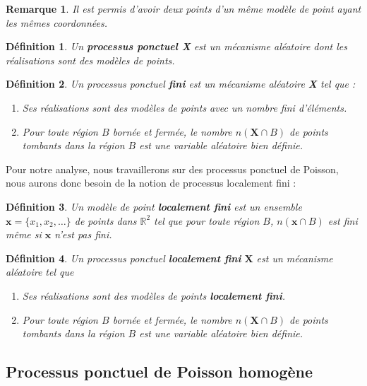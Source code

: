 \documentclass[12pt]{article}
\newcommand{\R}{\mathbb{R}}
\newtheorem*{rmq1}{Remarque}
\newtheorem*{defin1}{Définition}
\begin{document}
\begin{rmq1}
Il est permis d'avoir deux points d'un même modèle de point ayant les mêmes coordonnées.
\end{rmq1}

\begin{defin1}
Un \textbf{processus ponctuel X} est un mécanisme aléatoire dont les réalisations sont des modèles de points.
\end{defin1}

\begin{defin1}
Un processus ponctuel \textbf{fini} est un mécanisme aléatoire \textbf{X} tel que :
\begin{enumerate}
    \item Ses réalisations sont des modèles de points avec un nombre fini d'éléments.
    \item Pour toute région $B$ bornée et fermée, le nombre $n(\textbf{X}\cap B)$ de points tombants dans la région $B$ est une variable aléatoire bien définie.
\end{enumerate}
\end{defin1}
Pour notre analyse, nous travaillerons sur des processus ponctuel de Poisson, nous aurons donc besoin de la notion de processus localement fini :

\begin{defin1}
Un modèle de point \textbf{localement fini} est un ensemble $\textbf{x} = \{x_1,x_2,\dots\}$ de points dans $\R^2$ tel que pour toute région $B$, $n(\textbf{x}\cap B)$ est fini même si $\textbf{x}$ n'est pas fini.
\end{defin1}

\begin{defin1}
Un processus ponctuel \textbf{localement fini} $\textbf{X}$ est un mécanisme aléatoire tel que
\begin{enumerate}
    \item Ses réalisations sont des modèles de points \textbf{localement fini}.
    \item Pour toute région $B$ bornée et fermée, le nombre $n(\textbf{X}\cap B)$ de points tombants dans la région $B$ est une variable aléatoire bien définie.
\end{enumerate}
\end{defin1}

\subsection{Processus ponctuel de Poisson homogène}
\end{document}
